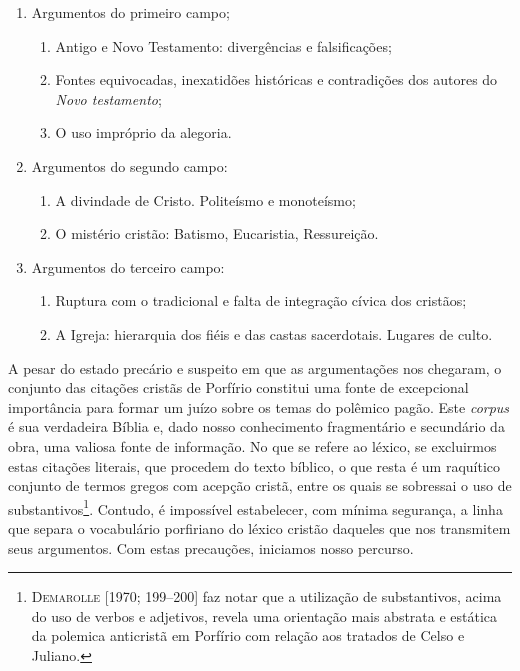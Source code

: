 \begin{enumerate}
\item Argumentos do primeiro campo;

\begin{enumerate}
\item Antigo e Novo Testamento: divergências e falsificações;

\item Fontes equivocadas, inexatidões históricas e contradições dos
autores do \textit{Novo testamento};

\item O uso impróprio da alegoria. 

\end{enumerate}

\item Argumentos do segundo campo: 

\begin{enumerate}
\item A divindade de Cristo. Politeísmo e monoteísmo;

\item O mistério cristão: Batismo, Eucaristia, Ressureição.
\end{enumerate}

\item Argumentos do terceiro campo:

  \begin{enumerate}
\item Ruptura com o tradicional e falta de integração cívica dos
cristãos;

\item A Igreja: hierarquia dos fiéis e das castas
sacerdotais. Lugares de culto.

\end{enumerate}
\end{enumerate}


A pesar do estado precário e suspeito em que as argumentações nos
chegaram, o conjunto das citações cristãs de Porfírio constitui uma
fonte de excepcional importância para formar um juízo sobre os temas do
polêmico pagão. Este \textit{corpus} é sua verdadeira Bíblia e, dado
nosso conhecimento fragmentário e secundário da obra, uma valiosa fonte
de informação. No que se refere ao léxico, se excluirmos estas citações
literais, que procedem do texto bíblico, o que resta é um raquítico
conjunto de termos gregos com acepção cristã, entre os quais se
sobressai o uso de substantivos\footnote{ \textsc{Demarolle} [1970; 199--200] 
faz notar que a utilização de substantivos, acima do uso de
verbos e adjetivos, revela uma orientação mais abstrata e estática da
polemica anticristã em Porfírio com relação aos tratados de Celso e
Juliano. }. Contudo, é impossível estabelecer, com mínima segurança, a
linha que separa o vocabulário porfiriano do léxico cristão daqueles
que nos transmitem seus argumentos. Com estas precauções, iniciamos
nosso percurso. 

